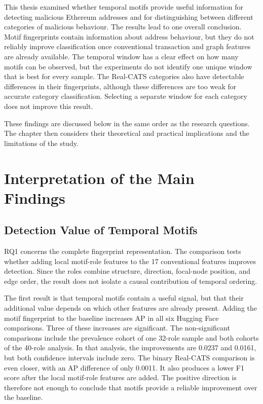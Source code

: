 \documentclass{thesisclass}
\begin{document}
This thesis examined whether temporal motifs provide useful information for
detecting malicious Ethereum addresses and for distinguishing between different
categories of malicious behaviour. The results lead to one overall conclusion.
Motif fingerprints contain information about address behaviour,
but they do not reliably improve classification once conventional transaction
and graph features are already available. The temporal window has a clear effect
on how many motifs can be observed, but the experiments do not identify one
unique window that is best for every sample. The Real-CATS categories also have
detectable differences in their fingerprints, although these differences are
too weak for accurate category classification. Selecting a separate window for
each category does not improve this result.

These findings are discussed below in the same order as the research questions.
The chapter then considers their theoretical and practical implications and the
limitations of the study.

\section{Interpretation of the Main Findings}

\subsection{Detection Value of Temporal Motifs}

RQ1 concerns the complete fingerprint representation. The comparison tests
whether adding local motif-role features to the 17 conventional features improves
detection. Since the roles combine structure, direction, focal-node position,
and edge order, the result does not isolate a causal contribution of temporal
ordering.

The first result is that temporal motifs contain a useful signal, but that their
additional value depends on which other features are already present. Adding the
motif fingerprint to the baseline increases AP in all six Hugging Face
comparisons. Three of these increases are significant. The non-significant
comparisons include the prevalence cohort of one 32-role sample and both
cohorts of the 40-role analysis. In that analysis, the improvements are 0.0237 and
0.0161, but both confidence intervals include zero. The
binary Real-CATS comparison is even closer, with an AP difference of only
0.0011. It also produces a lower F1 score after the local motif-role features are added.
The positive direction is therefore not enough to conclude that motifs provide
a reliable improvement over the baseline.
\end{document}
